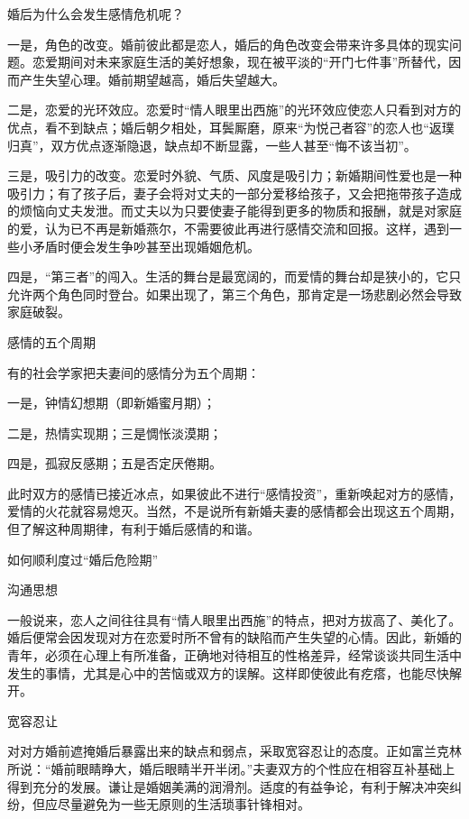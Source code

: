 \documentclass[12pt,UTF8]{ctexbook}
\begin{document}
婚后为什么会发生感情危机呢？

一是，角色的改变。婚前彼此都是恋人，婚后的角色改变会带来许多具体的现实问题。恋爱期间对未来家庭生活的美好想象，现在被平淡的“开门七件事”所替代，因而产生失望心理。婚前期望越高，婚后失望越大。

二是，恋爱的光环效应。恋爱时“情人眼里出西施”的光环效应使恋人只看到对方的优点，看不到缺点；婚后朝夕相处，耳鬓厮磨，原来“为悦己者容”的恋人也“返璞归真”，双方优点逐渐隐退，缺点却不断显露，一些人甚至“悔不该当初”。

三是，吸引力的改变。恋爱时外貌、气质、风度是吸引力；新婚期间性爱也是一种吸引力；有了孩子后，妻子会将对丈夫的一部分爱移给孩子，又会把拖带孩子造成的烦恼向丈夫发泄。而丈夫以为只要使妻子能得到更多的物质和报酬，就是对家庭的爱，认为已不再是新婚燕尔，不需要彼此再进行感情交流和回报。这样，遇到一些小矛盾时便会发生争吵甚至出现婚姻危机。

四是，“第三者”的闯入。生活的舞台是最宽阔的，而爱情的舞台却是狭小的，它只允许两个角色同时登台。如果出现了，第三个角色，那肯定是一场悲剧必然会导致家庭破裂。





感情的五个周期


有的社会学家把夫妻间的感情分为五个周期：

一是，钟情幻想期（即新婚蜜月期）；

二是，热情实现期；三是惆怅淡漠期；

四是，孤寂反感期；五是否定厌倦期。

此时双方的感情已接近冰点，如果彼此不进行“感情投资”，重新唤起对方的感情，爱情的火花就容易熄灭。当然，不是说所有新婚夫妻的感情都会出现这五个周期，但了解这种周期律，有利于婚后感情的和谐。





如何顺利度过“婚后危险期”


沟通思想

一般说来，恋人之间往往具有“情人眼里出西施”的特点，把对方拔高了、美化了。婚后便常会因发现对方在恋爱时所不曾有的缺陷而产生失望的心情。因此，新婚的青年，必须在心理上有所准备，正确地对待相互的性格差异，经常谈谈共同生活中发生的事情，尤其是心中的苦恼或双方的误解。这样即使彼此有疙瘩，也能尽快解开。

宽容忍让

对对方婚前遮掩婚后暴露出来的缺点和弱点，采取宽容忍让的态度。正如富兰克林所说：“婚前眼睛睁大，婚后眼睛半开半闭。”夫妻双方的个性应在相容互补基础上得到充分的发展。谦让是婚姻美满的润滑剂。适度的有益争论，有利于解决冲突纠纷，但应尽量避免为一些无原则的生活琐事针锋相对。
\end{document}
